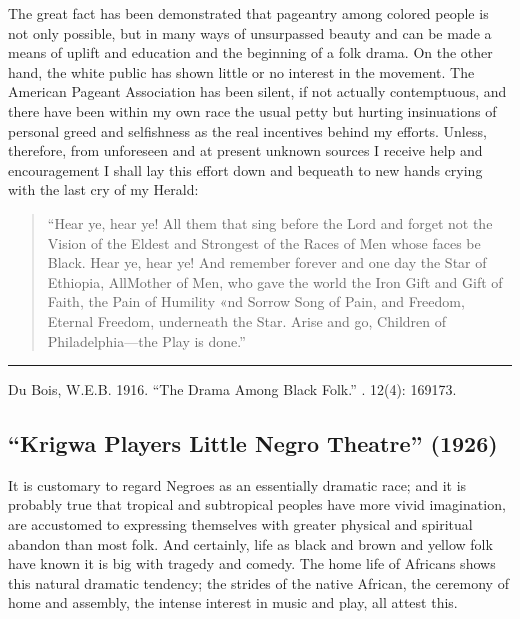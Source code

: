 \documentclass[letterpaper,10pt,english]{jupyterBook}
\begin{document}
\sphinxAtStartPar
The great fact has been demonstrated that pageantry among colored people is not only possible, but in many ways of unsurpassed beauty and can be made a means of uplift and education and the beginning of a folk drama. On the other hand, the white public has shown little or no interest in the movement. The American Pageant Association has been silent, if not actually contemptuous, and there have been within my own race the usual petty but hurting insinuations of personal greed and selfishness as the real incentives behind my efforts. Unless, therefore, from unforeseen and at present unknown sources I receive help and encouragement I shall lay this effort down and bequeath to new hands crying with the last cry of my Herald:
\begin{quote}

\sphinxAtStartPar
“Hear ye, hear ye! All them that sing before the Lord and forget not the Vision of the Eldest and Strongest of the Races of Men whose faces be Black. Hear ye, hear ye! And remember forever and one day the Star of Ethiopia, All\sphinxhyphen{}Mother of Men, who gave the world the Iron Gift and Gift of Faith, the Pain of Humility «nd Sorrow Song of Pain, and Freedom, Eternal Freedom, underneath the Star. Arise and go, Children of Philadelphia—the Play is done.”
\end{quote}


\bigskip\hrule\bigskip


\sphinxAtStartPar
{} Du Bois, W.E.B. 1916. “The Drama Among Black Folk.” . 12(4): 169\sphinxhyphen{}173.


\subsection{“Krigwa Players Little Negro Theatre” (1926)}
\label{\detokenize{Volumes/32/03/kgriwa:krigwa-players-little-negro-theatre-1926}}\label{\detokenize{Volumes/32/03/kgriwa::doc}}
\sphinxAtStartPar
{}

\sphinxAtStartPar
It is customary to regard Negroes as an essentially dramatic race; and it is probably true that tropical and sub\sphinxhyphen{}tropical peoples have more vivid imagination, are accustomed to expressing themselves with greater physical and spiritual abandon than most folk. And certainly, life as black and brown and yellow folk have known it is big with tragedy and comedy. The home life of Africans shows this natural dramatic tendency; the strides of the native African, the ceremony of home and assembly, the intense interest in music and play, all attest this.
\end{document}
